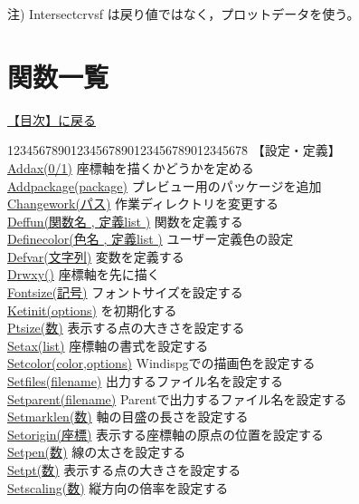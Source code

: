 \documentclass[papersize,a4paper,12pt,uplatex]{jsarticle}
\begin{document}
注) Intersectcrvsf は戻り値ではなく，プロットデータを使う。

\newpage
\hypertarget{functionlist}{}
\section{関数一覧}
\hyperlink{index}{【目次】に戻る}

\begin{tabbing}
12345678901234567890123456789012345678\=\kill
【設定・定義】\\
\hyperlink{addax}{Addax(0/1)}  \>座標軸を描くかどうかを定める\\
\hyperlink{addpackage}{Addpackage(package)}  \>プレビュー用のパッケージを追加\\
\hyperlink{changework}{Changework(パス)}    \>作業ディレクトリを変更する\\
\hyperlink{deffun}{Deffun(関数名 , 定義list )}  \>関数を定義する\\
\hyperlink{definecolor}{Definecolor(色名 , 定義list )}  \>ユーザー定義色の設定\\
\hyperlink{defvar}{Defvar(文字列)}   \>変数を定義する\\
\hyperlink{drwxy}{Drwxy()}     \>座標軸を先に描く\\
\hyperlink{fontsize}{Fontsize(記号)}      \>フォントサイズを設定する\\
\hyperlink{ketinit}{Ketinit(options)}      \>\ketcindy を初期化する\\
\hyperlink{ptsize}{Ptsize(数)}       \>表示する点の大きさを設定する\\
\hyperlink{setax}{Setax(list)}    \>座標軸の書式を設定する\\
\hyperlink{setcolor}{Setcolor(color,options)}    \>Windispgでの描画色を設定する\\
\hyperlink{setfiles}{Setfiles(filename)}    \>出力するファイル名を設定する\\
\hyperlink{setparent}{Setparent(filename)}    \>Parentで出力するファイル名を設定する\\
\hyperlink{setmarklen}{Setmarklen(数)}  \>軸の目盛の長さを設定する\\
\hyperlink{setorigin}{Setorigin(座標)}  \>表示する座標軸の原点の位置を設定する\\
\hyperlink{setpen}{Setpen(数)}      \>線の太さを設定する\\
\hyperlink{setpt}{Setpt(数)}          \>表示する点の大きさを設定する\\
\hyperlink{setscaling}{Setscaling(数)}    \>縦方向の倍率を設定する\\

\end{tabbing}
\end{document}
